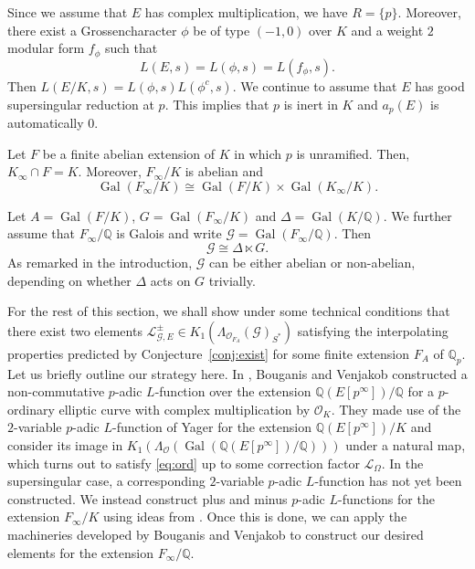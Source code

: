 \documentclass{amsart}
\begin{document}
Since we assume that $E$ has complex multiplication, we have $R=\{p\}$. Moreover, there exist a  Grossencharacter  $\phi$ be of type $(-1,0)$ over $K$ and a weight $2$ modular form $f_{\phi}$ such that
\[
L(E,s)=L(\phi,s)=L(f_\phi,s).
\]
Then $L(E/K,s)=L(\phi,s)L(\phi^c,s)$. We continue to assume that $E$ has good supersingular reduction at $p$. This implies that $p$ is inert in $K$ and $a_p(E)$ is automatically $0$.

Let $F$ be a finite abelian extension of $K$ in which $p$ is unramified. Then, $K_\infty\cap F=K$. Moreover, $F_\infty/K$ is abelian and
\[
\operatorname{Gal}(F_\infty/K)\cong\operatorname{Gal}(F/K)\times\operatorname{Gal}(K_\infty/K).
\]

Let $A=\operatorname{Gal}(F/K)$, $G=\operatorname{Gal}(F_\infty/K)$ and $\Delta=\operatorname{Gal}(K/{\mathbb Q})$. We further assume that $F_\infty/{\mathbb Q}$ is Galois and write ${\mathcal{G}}=\operatorname{Gal}(F_\infty/{\mathbb Q})$. Then
\begin{equation}\label{eq:gsemi}
{\mathcal{G}}\cong\Delta\ltimes G.
\end{equation}
As remarked in the introduction, ${\mathcal{G}}$ can be either abelian or non-abelian, depending on whether $\Delta$ acts on $G$ trivially.

For the rest of this section, we shall show under some technical conditions that there exist two elements ${\mathcal{L}}_{{\mathcal{G}},E}^\pm\in K_1(\Lambda_{{\mathcal{O}}_{F_A}}({\mathcal{G}})_{S^*})$ satisfying the interpolating properties predicted by Conjecture~\ref{conj:exist} for some finite extension $F_A$ of ${{\mathbb Q}_p}$. Let us briefly outline our strategy here. In \cite{bv10}, Bouganis and Venjakob constructed a non-commutative $p$-adic $L$-function over the extension ${\mathbb Q}(E[p^\infty])/{\mathbb Q}$ for a $p$-ordinary elliptic curve with complex multiplication by ${\mathcal{O}}_K$. They made use of the $2$-variable $p$-adic $L$-function of Yager \cite{yager82} for the extension ${\mathbb Q}(E[p^\infty])/K$ and consider its image in $K_1(\Lambda_{\mathcal{O}}(\operatorname{Gal}({\mathbb Q}(E[p^\infty])/{\mathbb Q})))$ under a natural map, which turns out to satisfy \eqref{eq:ord} up to some correction factor ${\mathcal{L}}_\Omega$. In the supersingular case, a corresponding $2$-variable $p$-adic $L$-function has not yet been constructed. We instead construct plus and minus $p$-adic $L$-functions for the extension $F_\infty/K$ using ideas from \cite{kimparkzhang}. Once this is done, we can apply the machineries developed by Bouganis and Venjakob to construct our desired elements for the extension $F_\infty/{\mathbb Q}$. 
\end{document}
